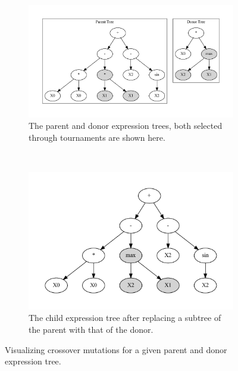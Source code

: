 \begin{figure}[htp]
  \centering
    \begin{subfigure}{\columnwidth}
      \begin{adjustbox}{width=\columnwidth,center}
        \includegraphics{images/graphviz/crossover_before.dot.pdf}
      \end{adjustbox}
      \caption{The parent and donor expression trees, both selected through tournaments are shown here.}
      \label{fig:crossover_muta}
    \end{subfigure}%
    \\
    \begin{subfigure}{\textwidth}
      \centering
      \includegraphics[scale=0.75]{images/graphviz/crossover_after.dot.pdf}
      \caption{The child expression tree after replacing a subtree of the parent with that of the donor.}
      \label{fig:crossover_mutb}
    \end{subfigure}
  \caption{Visualizing crossover mutations for a given parent and donor expression tree.}
  
  \label{fig:crossover}
\end{figure}

